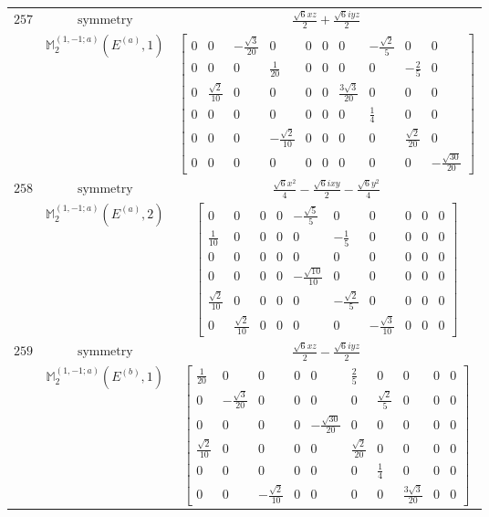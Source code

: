 \documentclass[fleqn,8pt,landscape]{jsarticle}
\begin{document}
\begin{longtable}{ccc}
$ 257 $ & $ \text{symmetry} $ & $ \frac{\sqrt{6} x z}{2} + \frac{\sqrt{6} i y z}{2} $ \\
$  $ & $ \mathbb{M}_{2}^{(1,-1;a)}(E^{(a)},1) $ & $ \begin{bmatrix} 0 & 0 & - \frac{\sqrt{3}}{20} & 0 & 0 & 0 & 0 & - \frac{\sqrt{2}}{5} & 0 & 0 \\ 0 & 0 & 0 & \frac{1}{20} & 0 & 0 & 0 & 0 & - \frac{2}{5} & 0 \\ 0 & \frac{\sqrt{2}}{10} & 0 & 0 & 0 & 0 & \frac{3 \sqrt{3}}{20} & 0 & 0 & 0 \\ 0 & 0 & 0 & 0 & 0 & 0 & 0 & \frac{1}{4} & 0 & 0 \\ 0 & 0 & 0 & - \frac{\sqrt{2}}{10} & 0 & 0 & 0 & 0 & \frac{\sqrt{2}}{20} & 0 \\ 0 & 0 & 0 & 0 & 0 & 0 & 0 & 0 & 0 & - \frac{\sqrt{30}}{20} \end{bmatrix} $ \\ \hline
$ 258 $ & $ \text{symmetry} $ & $ \frac{\sqrt{6} x^{2}}{4} - \frac{\sqrt{6} i x y}{2} - \frac{\sqrt{6} y^{2}}{4} $ \\
$  $ & $ \mathbb{M}_{2}^{(1,-1;a)}(E^{(a)},2) $ & $ \begin{bmatrix} 0 & 0 & 0 & 0 & - \frac{\sqrt{5}}{5} & 0 & 0 & 0 & 0 & 0 \\ \frac{1}{10} & 0 & 0 & 0 & 0 & - \frac{1}{5} & 0 & 0 & 0 & 0 \\ 0 & 0 & 0 & 0 & 0 & 0 & 0 & 0 & 0 & 0 \\ 0 & 0 & 0 & 0 & - \frac{\sqrt{10}}{10} & 0 & 0 & 0 & 0 & 0 \\ \frac{\sqrt{2}}{10} & 0 & 0 & 0 & 0 & - \frac{\sqrt{2}}{5} & 0 & 0 & 0 & 0 \\ 0 & \frac{\sqrt{2}}{10} & 0 & 0 & 0 & 0 & - \frac{\sqrt{3}}{10} & 0 & 0 & 0 \end{bmatrix} $ \\ \hline
$ 259 $ & $ \text{symmetry} $ & $ \frac{\sqrt{6} x z}{2} - \frac{\sqrt{6} i y z}{2} $ \\
$  $ & $ \mathbb{M}_{2}^{(1,-1;a)}(E^{(b)},1) $ & $ \begin{bmatrix} \frac{1}{20} & 0 & 0 & 0 & 0 & \frac{2}{5} & 0 & 0 & 0 & 0 \\ 0 & - \frac{\sqrt{3}}{20} & 0 & 0 & 0 & 0 & \frac{\sqrt{2}}{5} & 0 & 0 & 0 \\ 0 & 0 & 0 & 0 & - \frac{\sqrt{30}}{20} & 0 & 0 & 0 & 0 & 0 \\ \frac{\sqrt{2}}{10} & 0 & 0 & 0 & 0 & \frac{\sqrt{2}}{20} & 0 & 0 & 0 & 0 \\ 0 & 0 & 0 & 0 & 0 & 0 & \frac{1}{4} & 0 & 0 & 0 \\ 0 & 0 & - \frac{\sqrt{2}}{10} & 0 & 0 & 0 & 0 & \frac{3 \sqrt{3}}{20} & 0 & 0 \end{bmatrix} $ \\ \hline

\end{longtable}
\end{document}
